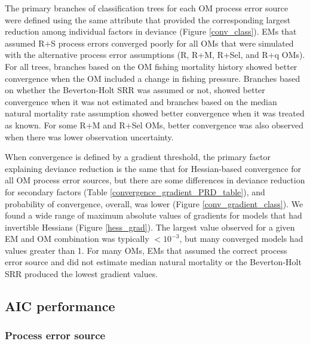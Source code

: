 \documentclass[
  12pt,
]{article}
\begin{document}
The primary branches of classification trees for each OM process error
source were defined using the same attribute that provided the
corresponding largest reduction among individual factors in deviance
(Figure \ref{conv_class}). EMs that assumed R+S process errors converged
poorly for all OMs that were simulated with the alternative process
error assumptions (R, R+M, R+Sel, and R+q OMs). For all trees, branches
based on the OM fishing mortality history showed better convergence when
the OM included a change in fishing pressure. Branches based on whether
the Beverton-Holt SRR was assumed or not, showed better convergence when
it was not estimated and branches based on the median natural mortality
rate assumption showed better convergence when it was treated as known.
For some R+M and R+Sel OMs, better convergence was also observed when
there was lower observation uncertainty.

When convergence is defined by a gradient threshold, the primary factor
explaining deviance reduction is the same that for Hessian-based
convergence for all OM process error sources, but there are some
differences in deviance reduction for secondary factors (Table
\ref{convergence_gradient_PRD_table}), and probability of convergence,
overall, was lower (Figure \ref{conv_gradient_class}). We found a wide
range of maximum absolute values of gradients for models that had
invertible Hessians (Figure \ref{hess_grad}). The largest value observed
for a given EM and OM combination was typically \(<10^{-3}\), but many
converged models had values greater than 1. For many OMs, EMs that
assumed the correct process error source and did not estimate median
natural mortality or the Beverton-Holt SRR produced the lowest gradient
values.

\subsection*{AIC performance}\label{aic-performance}

\subsubsection*{Process error source}\label{process-error-source}
\end{document}
